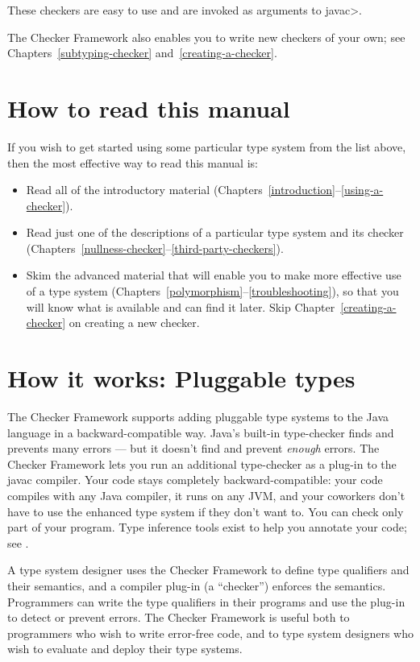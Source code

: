 \noindent
These checkers are easy to use and are invoked as arguments to \<javac>.


The Checker Framework also enables you to write new checkers of your
own; see Chapters~\ref{subtyping-checker} and~\ref{creating-a-checker}.


\section{How to read this manual\label{how-to-read-this-manual}}

If you wish to get started using some particular type system from the list
above, then the most effective way to read this manual is:

\begin{itemize}
\item
  Read all of the introductory material
  (Chapters~\ref{introduction}--\ref{using-a-checker}).
\item
  Read just one of the descriptions of a particular type system and its
  checker (Chapters~\ref{nullness-checker}--\ref{third-party-checkers}).
\item
  Skim the advanced material that will enable you to make more effective
  use of a type system
  (Chapters~\ref{polymorphism}--\ref{troubleshooting}), so that you will
  know what is available and can find it later.  Skip
  Chapter~\ref{creating-a-checker} on creating a new checker.
\end{itemize}


\section{How it works:  Pluggable types\label{pluggable-types}}

The Checker Framework supports adding
pluggable type systems to the Java language in a backward-compatible way.
Java's built-in type-checker finds and prevents many errors --- but it
doesn't find and prevent \emph{enough} errors.  The Checker Framework lets you
run an additional type-checker as a plug-in to the javac compiler.  Your
code stays completely backward-compatible:  your code compiles with any
Java compiler, it runs on any JVM, and your coworkers don't have to use the
enhanced type system if they don't want to.  You can check only part of
your program.  Type inference tools exist to help you annotate your
code; see .


A type system designer uses the Checker Framework to define type qualifiers
and their semantics, and a
compiler plug-in (a ``checker'') enforces the semantics.  Programmers can
write the type qualifiers in their programs and use the plug-in to detect
or prevent errors.  The Checker Framework is useful both to programmers who
wish to write error-free code, and to type system designers who wish to
evaluate and deploy their type systems.



